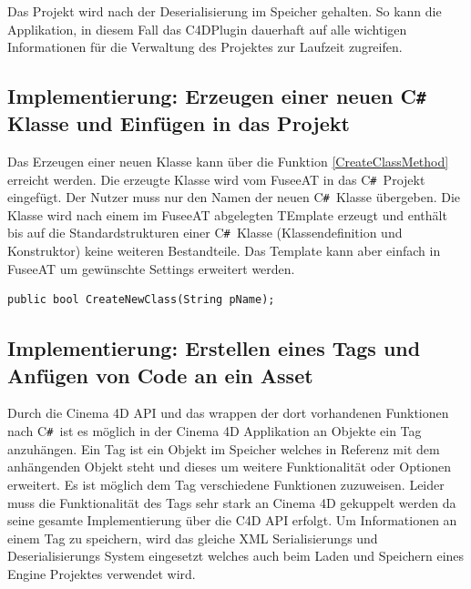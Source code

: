 \documentclass[pagesize, paper=a4, fontsize=12pt, titlepage=true, headings=small, headnosepline, abstractoff, liststotoc, nochapterprefix, plainheadsepline, twoside]{scrreprt}
\newcommand{\CSS}{C\texttt{\# }}
\begin{document}
Das Projekt wird nach der Deserialisierung im Speicher gehalten. So kann die Applikation, in diesem Fall das C4DPlugin dauerhaft auf alle wichtigen Informationen für die Verwaltung des Projektes zur Laufzeit zugreifen.

\subsection{Implementierung: Erzeugen einer neuen \CSS Klasse und Einfügen in das Projekt}
Das Erzeugen einer neuen Klasse kann über die Funktion \ref{CreateClassMethod} erreicht werden. Die erzeugte Klasse wird vom FuseeAT in das \CSS Projekt eingefügt. Der Nutzer muss nur den Namen der neuen \CSS Klasse übergeben. Die Klasse wird nach einem im FuseeAT abgelegten TEmplate erzeugt und enthält bis auf die Standardstrukturen einer \CSS Klasse (Klassendefinition und Konstruktor) keine weiteren Bestandteile. Das Template kann aber einfach in FuseeAT um gewünschte Settings erweitert werden.
\begin{lstlisting}[label=CreateClassMethod, caption=Funktion zum Erstellen einer neuen Klasse im \CSS Projekt.]
	public bool CreateNewClass(String pName);
\end{lstlisting}

\subsection{Implementierung: Erstellen eines Tags und Anfügen von Code an ein Asset}
Durch die Cinema 4D API und das wrappen der dort vorhandenen Funktionen nach \CSS ist es möglich in der Cinema 4D Applikation an Objekte ein Tag anzuhängen. Ein Tag ist ein Objekt im Speicher welches in Referenz mit dem anhängenden Objekt steht und dieses um weitere Funktionalität oder Optionen erweitert. Es ist möglich dem Tag verschiedene Funktionen zuzuweisen. Leider muss die Funktionalität des Tags sehr stark an Cinema 4D gekuppelt werden da seine gesamte Implementierung über die C4D API erfolgt.
Um Informationen an einem Tag zu speichern, wird das gleiche XML Serialisierungs und Deserialisierungs System eingesetzt welches auch beim Laden und Speichern eines Engine Projektes verwendet wird.
\end{document}
